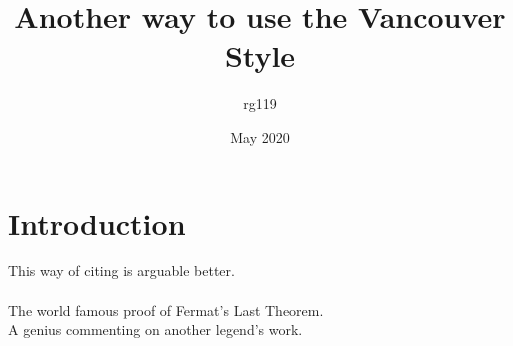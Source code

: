 \documentclass{article}
\title{Another way to use the Vancouver Style}
\author{rg119 }
\date{May 2020}
\begin{document}
\maketitle


\section{Introduction}
This way of citing is arguable better.\\~\\
The world famous proof of Fermat's Last Theorem.\cite{10.2307/2118559}\\
A genius commenting on another legend's work.\cite{tao2006perelmans}\\

\printbibliography[
heading=bibintoc,
title={References}
]
\end{document}
